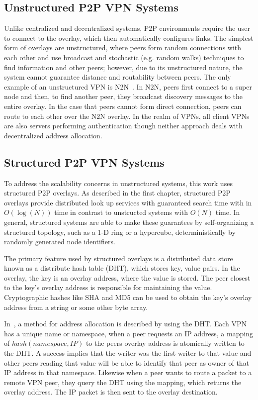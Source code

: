 \subsection{Unstructured P2P VPN Systems} Unlike centralized and decentralized
systems, P2P environments require the user to connect to the overlay, which
then automatically configures links.  The simplest form of overlays are
unstructured, where peers form random connections with each other and use
broadcast and stochastic (e.g. random walks) techniques to find information and
other peers; however, due to its unstructured nature, the system cannot
guarantee distance and routability between peers.  The only example of an
unstructured VPN is N2N~\cite{n2n}.  In N2N, peers first connect to a super
node and then, to find another peer, they broadcast discovery messages to the
entire overlay.  In the case that peers cannot form direct connection, peers
can route to each other over the N2N overlay.  In the realm of VPNs, all client
VPNs are also servers performing authentication though neither approach deals
with decentralized address allocation.

\subsection{Structured P2P VPN Systems}

To address the scalability concerns in unstructured systems, this work uses
structured P2P overlays.  As described in the first chapter, structured P2P
overlays provide distributed look up services with guaranteed search time with
in $O(\log(N))$ time in contrast to unstructed systems with $O(N)$ time.  In
general, structured systems are able to make these guarantees by
self-organizing a structured topology, such as a 1-D ring or a hypercube,
deterministically by randomly generated node identifiers.

The primary feature used by structured overlays is a distributed data store
known as a distribute hash table (DHT), which stores key, value pairs.  In
the overlay, the key is an overlay address, where the value is stored.  The
peer closest to the key's overlay address is responsible for maintaining the
value.  Cryptographic hashes like SHA and MD5 can be used to obtain the key's
overlay address from a string or some other byte array.

In~\cite{pcgrid07, i3}, a method for address allocation is described by using
the DHT.  Each VPN has a unique name or namespace, when a peer requests an
IP address, a mapping of $hash(namespace, IP)$ to the peers overlay address
is atomically written to the DHT.  A success implies that the writer was the
first writer to that value and other peers reading that value will be able to
identify that peer as owner of that IP address in that namespace.  Likewise
when a peer wants to route a packet to a remote VPN peer, they query the DHT
using the mapping, which returns the overlay address.  The IP packet is then
sent to the overlay destination.

